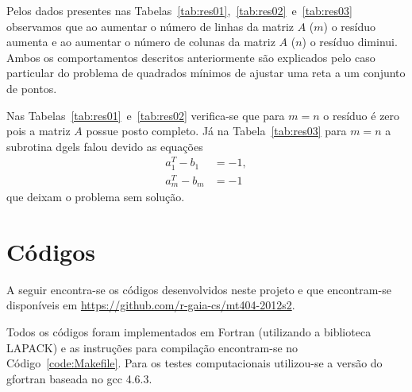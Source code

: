 \documentclass[12pt,a4paper]{article}
\begin{document}
Pelos dados presentes nas
Tabelas~\ref{tab:res01},~\ref{tab:res02}~e~\ref{tab:res03} observamos que ao
aumentar o número de linhas da matriz $A$ ($m$) o resíduo aumenta e ao
aumentar o número de colunas da matriz $A$ ($n$) o resíduo diminui. Ambos os
comportamentos descritos anteriormente são explicados pelo caso
particular do problema de quadrados mínimos de ajustar uma reta a um
conjunto de pontos.

Nas Tabelas~\ref{tab:res01}~e~\ref{tab:res02} verifica-se que para $m = n$ o
resíduo é zero pois a matriz $A$ possue posto completo. Já na
Tabela~\ref{tab:res03} para $m = n$ a subrotina dgels falou devido as
equações
\begin{align*}
    a_1^T - b_1 &= -1, \\
    a_m^T - b_m &= -1
\end{align*}
que deixam o problema sem solução.

\section{C\'{o}digos}
A seguir encontra-se os c\'{o}digos desenvolvidos neste projeto e que
encontram-se disponíveis em \url{https://github.com/r-gaia-cs/mt404-2012s2}.

Todos os c\'{o}digos foram implementados em Fortran (utilizando a
biblioteca LAPACK\nocite{LAPACK}) e as instruções para
compilação encontram-se no Código~\ref{code:Makefile}. Para os testes
computacionais utilizou-se a versão do gfortran baseada no gcc 4.6.3.





\end{document}
